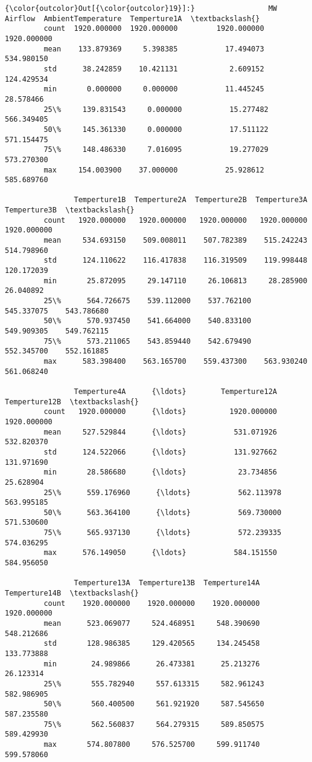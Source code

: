 \documentclass[11pt]{article}
\begin{document}
\begin{Verbatim}[commandchars=\\\{\}]
{\color{outcolor}Out[{\color{outcolor}19}]:}                 MW      Airflow  AmbientTemperature  Temperture1A  \textbackslash{}
         count  1920.000000  1920.000000         1920.000000   1920.000000   
         mean    133.879369     5.398385           17.494073    534.980150   
         std      38.242859    10.421131            2.609152    124.429534   
         min       0.000000     0.000000           11.445245     28.578466   
         25\%     139.831543     0.000000           15.277482    566.349405   
         50\%     145.361330     0.000000           17.511122    571.154475   
         75\%     148.486330     7.016095           19.277029    573.270300   
         max     154.003900    37.000000           25.928612    585.689760   
         
                Temperture1B  Temperture2A  Temperture2B  Temperture3A  Temperture3B  \textbackslash{}
         count   1920.000000   1920.000000   1920.000000   1920.000000   1920.000000   
         mean     534.693150    509.008011    507.782389    515.242243    514.798960   
         std      124.110622    116.417838    116.319509    119.998448    120.172039   
         min       25.872095     29.147110     26.106813     28.285900     26.040892   
         25\%      564.726675    539.112000    537.762100    545.337075    543.786680   
         50\%      570.937450    541.664000    540.833100    549.909305    549.762115   
         75\%      573.211065    543.859440    542.679490    552.345700    552.161885   
         max      583.398400    563.165700    559.437300    563.930240    561.068240   
         
                Temperture4A      {\ldots}        Temperture12A  Temperture12B  \textbackslash{}
         count   1920.000000      {\ldots}          1920.000000    1920.000000   
         mean     527.529844      {\ldots}           531.071926     532.820370   
         std      124.522066      {\ldots}           131.927662     131.971690   
         min       28.586680      {\ldots}            23.734856      25.628904   
         25\%      559.176960      {\ldots}           562.113978     563.995185   
         50\%      563.364100      {\ldots}           569.730000     571.530600   
         75\%      565.937130      {\ldots}           572.239335     574.036295   
         max      576.149050      {\ldots}           584.151550     584.956050   
         
                Temperture13A  Temperture13B  Temperture14A  Temperture14B  \textbackslash{}
         count    1920.000000    1920.000000    1920.000000    1920.000000   
         mean      523.069077     524.468951     548.390690     548.212686   
         std       128.986385     129.420565     134.245458     133.773888   
         min        24.989866      26.473381      25.213276      26.123314   
         25\%       555.782940     557.613315     582.961243     582.986905   
         50\%       560.400500     561.921920     587.545650     587.235580   
         75\%       562.560837     564.279315     589.850575     589.429930   
         max       574.807800     576.525700     599.911740     599.578060   
         

\end{Verbatim}
\end{document}
